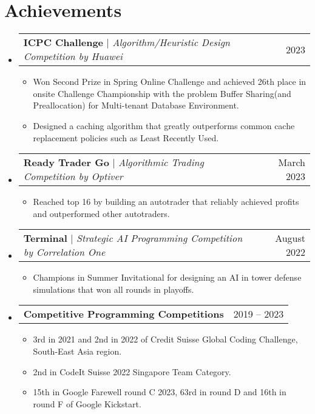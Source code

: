 \documentclass[letterpaper,11pt]{article}
\makeatletter
\newcommand{\resumeItem}[1]{
  \item\footnotesize{
    {#1 \vspace{-2pt}}
  }
}
\newcommand{\resumeProjectHeading}[2]{
    \item
    \begin{tabular*}{0.97\textwidth}{l@{\extracolsep{\fill}}r}
      \small#1 & #2 \\
    \end{tabular*}\vspace{-6pt}
}
\newcommand{\resumeSubHeadingListStart}{\begin{itemize}[leftmargin=0.15in, label={}]}
\newcommand{\resumeSubHeadingListEnd}{\end{itemize}}
\newcommand{\resumeItemListStart}{\begin{itemize}}
\newcommand{\resumeItemListEnd}{\end{itemize}\vspace{-7pt}}
\makeatother
\begin{document}
\section{Achievements}
    \resumeSubHeadingListStart
      \resumeProjectHeading
          {\textbf{ICPC Challenge} $|$ \emph{Algorithm/Heuristic Design Competition by Huawei}}{2023}
          \resumeItemListStart
            \resumeItem{Won Second Prize in Spring Online Challenge and achieved 26th place in onsite Challenge Championship with the problem Buffer Sharing(and Preallocation) for Multi-tenant Database Environment. }
            \resumeItem{Designed a caching algorithm that greatly outperforms common cache replacement policies such as Least Recently Used. }
          \resumeItemListEnd
      \resumeProjectHeading
          {\textbf{Ready Trader Go} $|$ \emph{Algorithmic Trading Competition by Optiver}}{March 2023}
          \resumeItemListStart
            \resumeItem{Reached top 16 by building an autotrader that reliably achieved profits and outperformed other autotraders.}
          \resumeItemListEnd
      \resumeProjectHeading
          {\textbf{Terminal} $|$ \emph{Strategic AI Programming Competition by Correlation One}}{August 2022}
          \resumeItemListStart
            \resumeItem{Champions in Summer Invitational for designing an AI in tower defense simulations that won all rounds in playoffs.}
          \resumeItemListEnd
      \resumeProjectHeading
          {\textbf{Competitive Programming Competitions} \emph{}}{2019 -- 2023}
          \resumeItemListStart
            \resumeItem{3rd in 2021 and 2nd in 2022 of Credit Suisse Global Coding Challenge, South-East Asia region.}
            \resumeItem{2nd in CodeIt Suisse 2022 Singapore Team Category.}
            \resumeItem{15th in Google Farewell round C 2023, 63rd in round D and 16th in round F of Google Kickstart.}
          \resumeItemListEnd
    \resumeSubHeadingListEnd

\end{document}
